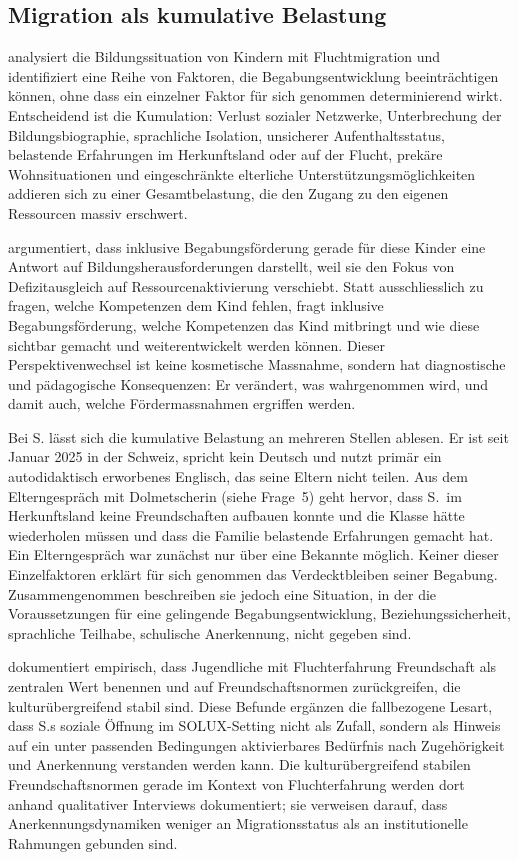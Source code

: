 \documentclass[ngerman, a4paper]{article}
\begin{document}
\subsection{Migration als kumulative Belastung}

\textcite[S.\,86--98]{behrensen2019inklusive} analysiert die Bildungssituation von Kindern mit Fluchtmigration und
identifiziert eine Reihe von Faktoren, die Begabungsentwicklung beeinträchtigen können,
ohne dass ein einzelner Faktor für sich genommen determinierend wirkt. Entscheidend
ist die Kumulation: Verlust sozialer Netzwerke, Unterbrechung der Bildungsbiographie,
sprachliche Isolation, unsicherer Aufenthaltsstatus, belastende Erfahrungen im
Herkunftsland oder auf der Flucht, prekäre Wohnsituationen und eingeschränkte
elterliche Unterstützungsmöglichkeiten addieren sich zu einer Gesamtbelastung, die
den Zugang zu den eigenen Ressourcen massiv erschwert.

\textcite[S.\,86--98]{behrensen2019inklusive} argumentiert, dass inklusive Begabungsförderung gerade für diese Kinder
eine Antwort auf Bildungsherausforderungen darstellt, weil sie den Fokus von
Defizitausgleich auf Ressourcenaktivierung verschiebt. Statt ausschliesslich zu fragen,
welche Kompetenzen dem Kind fehlen, fragt inklusive Begabungsförderung, welche
Kompetenzen das Kind mitbringt und wie diese sichtbar gemacht und weiterentwickelt
werden können. Dieser Perspektivenwechsel ist keine kosmetische Massnahme, sondern
hat diagnostische und pädagogische Konsequenzen: Er verändert, was wahrgenommen wird,
und damit auch, welche Fördermassnahmen ergriffen werden.

Bei S. lässt sich die kumulative Belastung an mehreren Stellen ablesen. Er ist seit
Januar 2025 in der Schweiz, spricht kein Deutsch und nutzt primär ein autodidaktisch
erworbenes Englisch, das seine Eltern nicht teilen. Aus dem Elterngespräch mit
Dolmetscherin (siehe Frage~5) geht hervor, dass S.\ im Herkunftsland keine
Freundschaften aufbauen konnte und die Klasse hätte wiederholen müssen und
dass die Familie belastende Erfahrungen gemacht hat. Ein Elterngespräch war
zunächst nur über eine Bekannte möglich. Keiner dieser Einzelfaktoren erklärt für sich genommen das
Verdecktbleiben seiner Begabung. Zusammengenommen beschreiben sie jedoch eine Situation,
in der die Voraussetzungen für eine gelingende Begabungsentwicklung,
Beziehungssicherheit, sprachliche Teilhabe, schulische Anerkennung,
nicht gegeben sind.

\textcite[S.\,40--49]{baumert2022freundschaftwerte} dokumentiert empirisch, dass
Jugendliche mit Fluchterfahrung Freundschaft als zentralen Wert benennen und
auf Freundschaftsnormen zurückgreifen, die kulturübergreifend stabil sind.
Diese Befunde ergänzen die fallbezogene Lesart, dass S.s soziale Öffnung im
SOLUX-Setting nicht als Zufall, sondern als Hinweis auf ein unter passenden
Bedingungen aktivierbares Bedürfnis nach Zugehörigkeit und Anerkennung
verstanden werden kann. Die kulturübergreifend stabilen Freundschaftsnormen
gerade im Kontext von Fluchterfahrung werden dort anhand
qualitativer Interviews dokumentiert; sie verweisen darauf, dass Anerkennungsdynamiken
weniger an Migrationsstatus als an institutionelle Rahmungen gebunden sind.
\end{document}
